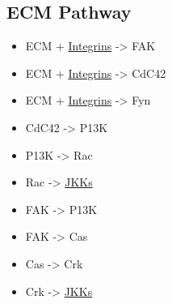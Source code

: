 \documentclass[11pt]{article}
\begin{document}
\subsection{ECM Pathway}
\label{sec-7-9}
\begin{itemize}
\item ECM + \uline{Integrins} -> FAK
\item ECM + \uline{Integrins} -> CdC42
\item ECM + \uline{Integrins} -> Fyn
\item CdC42 -> P13K
\item P13K -> Rac
\item Rac -> \uline{JKKs}
\item FAK -> P13K
\item FAK -> Cas
\item Cas -> Crk
\item Crk -> \uline{JKKs}
\end{itemize}





\begin{quote}
\end{quote}
\end{document}

